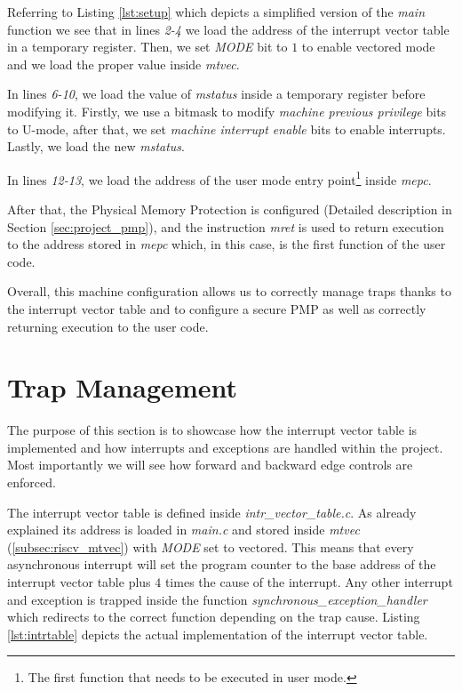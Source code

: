 Referring to Listing \ref{lst:setup} which depicts a simplified version of the \textit{main}
function we see that in lines \textit{2-4} we load the address of the interrupt vector
table in a temporary register. Then, we set \textit{MODE} bit to $1$ to enable
vectored mode and we load the proper value inside \textit{mtvec}.

In lines \textit{6-10}, we load the value of \textit{mstatus} inside a temporary
register before modifying it. Firstly, we use a bitmask to modify \textit{machine
previous privilege} bits to U-mode, after that, we set \textit{machine interrupt
enable} bits to enable interrupts. Lastly, we load the new \textit{mstatus}.

In lines \textit{12-13}, we load the address of the user mode entry point\footnote{The
first function that needs to be executed in user mode.} inside \textit{mepc}.

After that, the Physical Memory Protection is configured (Detailed description in
Section \ref{sec:project_pmp}), and the instruction \textit{mret} is used to
return execution to the address stored in \textit{mepc} which, in this case, is the
first function of the user code.

Overall, this machine configuration allows us to correctly manage traps thanks
to the interrupt vector table and to configure a secure PMP as well as correctly
returning execution to the user code.

\section{Trap Management}
\label{sec:project_isr}

The purpose of this section is to showcase how the interrupt vector table is implemented
and how interrupts and exceptions are handled within the project. Most
importantly we will see how forward and backward edge controls are enforced.

The interrupt vector table is defined inside \textit{intr\_vector\_table.c}. As
already explained its address is loaded in \textit{main.c} and stored inside \textit{mtvec}
(\ref{subsec:riscv_mtvec}) with \textit{MODE} set to vectored. This means that
every asynchronous interrupt will set the program counter to the base address of
the interrupt vector table plus $4$ times the cause of the interrupt. Any other interrupt
and exception is trapped inside the function \textit{synchronous\_exception\_handler}
which redirects to the correct function depending on the trap cause. Listing \ref{lst:intrtable}
depicts the actual implementation of the interrupt vector table.

